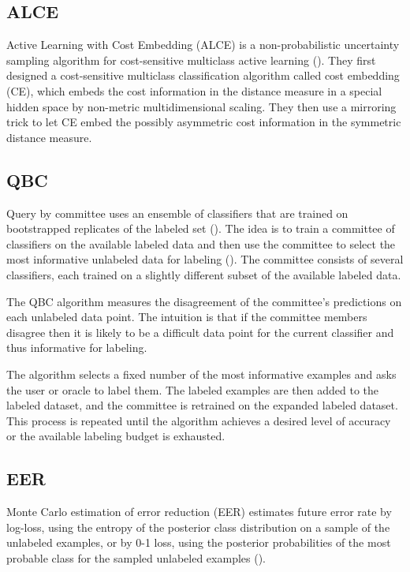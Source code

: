 \subsection{ALCE}
Active Learning with Cost Embedding (ALCE) is a non-probabilistic uncertainty sampling algorithm for cost-sensitive multiclass active learning (\cite{huang2016alce}). They first designed a cost-sensitive multiclass classification algorithm called cost embedding (CE), which embeds the cost information in the distance measure in a special hidden space by non-metric multidimensional scaling. They then use a mirroring trick to let CE embed the possibly asymmetric cost information in the symmetric distance measure.

\subsection{QBC}
Query by committee uses an ensemble of classifiers that are trained on bootstrapped replicates of the labeled set (\cite{seung1992qbc}). The idea is to train a committee of classifiers on the available labeled data and then use the committee to select the most informative unlabeled data for labeling (\cite{freund1997qbc}). The committee consists of several classifiers, each trained on a slightly different subset of the available labeled data.

The QBC algorithm measures the disagreement of the committee's predictions on each unlabeled data point. The intuition is that if the committee members disagree then it is likely to be a difficult data point for the current classifier and thus informative for labeling.

The algorithm selects a fixed number of the most informative examples and asks the user or oracle to label them. The labeled examples are then added to the labeled dataset, and the committee is retrained on the expanded labeled dataset. This process is repeated until the algorithm achieves a desired level of accuracy or the available labeling budget is exhausted.

\subsection{EER}
Monte Carlo estimation of error reduction (EER) estimates future error rate by log-loss, using the entropy of the posterior class distribution on a sample of the unlabeled examples, or by 0-1 loss, using the posterior probabilities of the most probable class for the sampled unlabeled examples (\cite{roy2001eer}).

